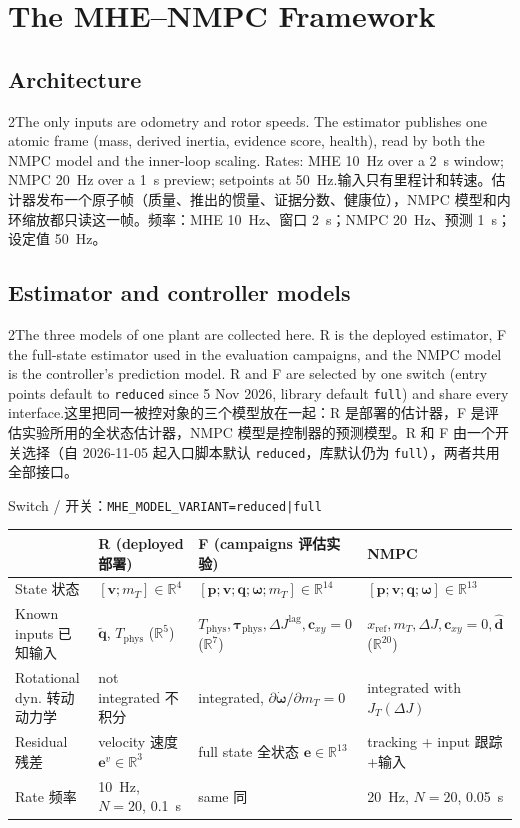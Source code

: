 \documentclass[10pt,a4paper]{article}
\numberwithin{equation}{section}
\newcommand{\dJ}{\Delta J}
\newcommand{\mT}{m_T}
\newcommand{\Jt}{J_T}
\newcommand{\Tphys}{T_{\mathrm{phys}}}
\newcommand{\tauphys}{\bm{\tau}_{\mathrm{phys}}}
\newcommand{\pair}[2]{\begin{paracol}{2}#1\switchcolumn #2\end{paracol}}
\newcommand{\bsec}[2]{\section{#1\quad{\normalfont\large #2}}}
\newcommand{\bsub}[2]{\needspace{8\baselineskip}\subsection{#1\quad{\normalfont #2}}}
\begin{document}
\clearpage
\bsec{The MHE--NMPC Framework}{MHE--NMPC 框架}

\bsub{Architecture}{系统架构}
\pair{The only inputs are odometry and rotor speeds. The estimator publishes one
atomic frame (mass, derived inertia, evidence score, health), read by both the
NMPC model and the inner-loop scaling. Rates: MHE \SI{10}{\hertz} over a
\SI{2}{\second} window; NMPC \SI{20}{\hertz} over a \SI{1}{\second} preview;
setpoints at \SI{50}{\hertz}.}
{输入只有里程计和转速。估计器发布一个原子帧（质量、推出的惯量、证据分数、健康位），NMPC 模型和内环缩放都只读这一帧。频率：MHE \SI{10}{\hertz}、窗口 \SI{2}{\second}；NMPC \SI{20}{\hertz}、预测 \SI{1}{\second}；设定值 \SI{50}{\hertz}。}

\bsub{Estimator and controller models}{估计器与控制器模型}\label{sec:models}
\pair{The three models of one plant are collected here. R is the deployed
estimator, F the full-state estimator used in the evaluation campaigns, and the
NMPC model is the controller's prediction model. R and F are selected by one
switch (entry points default to \texttt{reduced} since 5 Nov 2026, library
default \texttt{full}) and share every interface.}
{这里把同一被控对象的三个模型放在一起：R 是部署的估计器，F 是评估实验所用的全状态估计器，NMPC 模型是控制器的预测模型。R 和 F 由一个开关选择（自 2026-11-05 起入口脚本默认 \texttt{reduced}，库默认仍为 \texttt{full}），两者共用全部接口。}
\begin{center}\small Switch / 开关：\texttt{MHE\_MODEL\_VARIANT=reduced|full}\end{center}
\begin{center}\small
\begin{tabularx}{\textwidth}{@{}>{\raggedright\arraybackslash}p{} >{\raggedright\arraybackslash}X >{\raggedright\arraybackslash}X >{\raggedright\arraybackslash}X@{}}
\toprule
 & \textbf{R} (deployed 部署) & \textbf{F} (campaigns 评估实验) & \textbf{NMPC} \\
\midrule
State 状态 & $[\bm v;\mT]\in\mathbb R^4$ & $[\bm p;\bm v;\bm q;\bm\omega;\mT]\in\mathbb R^{14}$ & $[\bm p;\bm v;\bm q;\bm\omega]\in\mathbb R^{13}$\\
Known inputs 已知输入 & $\tilde{\bm q}$, $\Tphys$ ($\mathbb R^5$) & $\Tphys,\tauphys,\dJ^{\mathrm{lag}},\bm c_{xy}{=}0$ ($\mathbb R^7$) & $x_{\mathrm{ref}},\mT,\dJ,\bm c_{xy}{=}0,\hat{\bm d}$ ($\mathbb R^{20}$)\\
Rotational dyn. 转动动力学 & not integrated 不积分 & integrated, $\partial\dot{\bm\omega}/\partial\mT=0$ & integrated with $\Jt(\dJ)$\\
Residual 残差 & velocity 速度 $\bm e^v\in\mathbb R^3$ & full state 全状态 $\bm e\in\mathbb R^{13}$ & tracking + input 跟踪+输入\\
Rate 频率 & \SI{10}{\hertz}, $N=20$, \SI{0.1}{s} & same 同 & \SI{20}{\hertz}, $N=20$, \SI{0.05}{s}\\
\bottomrule
\end{tabularx}
\end{center}
\end{document}
